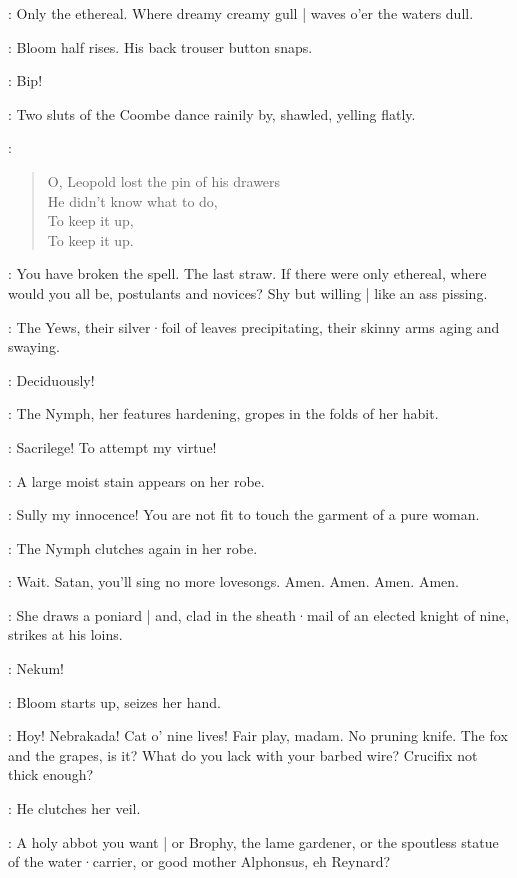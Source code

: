 \Nymph:
Only the ethereal.
Where dreamy creamy gull |
waves o'er the waters dull.

:
Bloom half rises.
His back trouser button snaps.

\Button:
Bip!

:
Two sluts of the Coombe dance rainily by,
shawled,
yelling flatly.

\Sluts:
\begin{verse}
    O, Leopold lost the pin of his drawers\\
    He didn't know what to do,\\
    To keep it up,\\
    To keep it up.
\end{verse}

\Bloom:
You have broken the spell.
The last straw.
If there were only ethereal,
where would you all be,
postulants and novices?
%
Shy but willing |
like an ass pissing.

:
The Yews,
their silver·foil of leaves precipitating,
their skinny arms aging and swaying.

\Yews:
Deciduously!

:
The Nymph,
her features hardening,
gropes in the folds of her habit.

\Nymph:
Sacrilege!
To attempt my virtue!

:
A large moist stain appears on her robe.

\Nymph:
Sully my innocence!
You are not fit to touch the garment of a pure woman.

:
The Nymph clutches again in her robe.

\Nymph:
Wait.
Satan,
you'll sing no more lovesongs.
Amen.
Amen.
Amen.
Amen.

:
She draws a poniard |
and,
clad in the sheath·mail of an elected knight of nine,
strikes at his loins.

\Nymph:
Nekum!

:
Bloom starts up,
seizes her hand.

\Bloom:
Hoy!
Nebrakada!
Cat o' nine lives!
Fair play,
madam.
No pruning knife.
The fox and the grapes,
is it?
What do you lack with your barbed wire?
Crucifix not thick enough?

:
He clutches her veil.

\Bloom:
A holy abbot you want |
or Brophy,
the lame gardener,
or the spoutless statue of the water·carrier,
or good mother Alphonsus,
eh Reynard?

